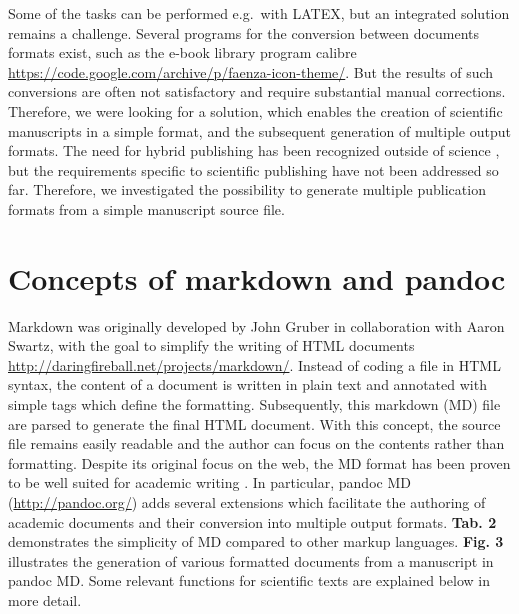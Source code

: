 \documentclass[10pt,fleqn]{wlpeerj}
\begin{document}
Some
of
the
tasks
can
be
performed
e.g.~with
LATEX,
but
an
integrated
solution
remains
a
challenge.
Several
programs
for
the
conversion
between
documents
formats
exist,
such
as
the
e-book
library
program
calibre
\url{https://code.google.com/archive/p/faenza-icon-theme/}.
But
the
results
of
such
conversions
are
often
not
satisfactory
and
require
substantial
manual
corrections.
Therefore,
we
were
looking
for a
solution,
which
enables
the
creation
of
scientific
manuscripts
in a
simple
format,
and
the
subsequent
generation
of
multiple
output
formats.
The
need
for
hybrid
publishing
has
been
recognized
outside
of
science
\citep{dptcollective_toolkit_2015, kielhorn_multi_2011},
but
the
requirements
specific
to
scientific
publishing
have
not
been
addressed
so
far.
Therefore,
we
investigated
the
possibility
to
generate
multiple
publication
formats
from
a
simple
manuscript
source
file.

\section{Concepts
of
markdown
and
pandoc}\label{concepts-of-markdown-and-pandoc}

Markdown
was
originally
developed
by
John
Gruber
in
collaboration
with
Aaron
Swartz,
with
the
goal
to
simplify
the
writing
of
HTML
documents
\url{http://daringfireball.net/projects/markdown/}.
Instead
of
coding
a
file
in
HTML
syntax,
the
content
of a
document
is
written
in
plain
text
and
annotated
with
simple
tags
which
define
the
formatting.
Subsequently,
this
markdown
(MD)
file
are
parsed
to
generate
the
final
HTML
document.
With
this
concept,
the
source
file
remains
easily
readable
and
the
author
can
focus
on
the
contents
rather
than
formatting.
Despite
its
original
focus
on
the
web,
the
MD
format
has
been
proven
to be
well
suited
for
academic
writing
\citep{ovadia_markdown_2014}.
In
particular,
pandoc
MD
(\url{http://pandoc.org/})
adds
several
extensions
which
facilitate
the
authoring
of
academic
documents
and
their
conversion
into
multiple
output
formats.
\textbf{Tab.
2}
demonstrates
the
simplicity
of MD
compared
to
other
markup
languages.
\textbf{Fig.
3}
illustrates
the
generation
of
various
formatted
documents
from
a
manuscript
in
pandoc
MD.
Some
relevant
functions
for
scientific
texts
are
explained
below
in
more
detail.
\end{document}
